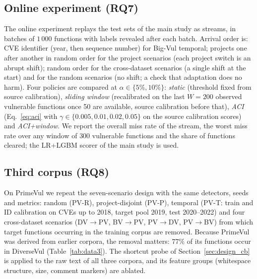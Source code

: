 \subsection{Online experiment (RQ7)}\label{sec:design_online}
The online experiment replays the test sets of the main study as streams, in batches of $1\,000$ functions with labels revealed after each batch. Arrival order is: CVE identifier (year, then sequence number) for Big-Vul temporal; projects one after another in random order for the project scenarios (each project switch is an abrupt shift); random order for the cross-dataset scenarios (a single shift at the start) and for the random scenarios (no shift; a check that adaptation does no harm). Four policies are compared at $\alpha\in\{5\%,10\%\}$: \emph{static} (threshold fixed from source calibration), \emph{sliding window} (recalibrated on the last $W{=}200$ observed vulnerable functions once 50 are available, source calibration before that), \emph{ACI} (Eq.~\eqref{eq:aci} with $\gamma\in\{0.005,0.01,0.02,0.05\}$ on the source calibration scores) and \emph{ACI+window}. We report the overall miss rate of the stream, the worst miss rate over any window of $300$ vulnerable functions and the share of functions cleared; the LR+LGBM scorer of the main study is used.

\subsection{Third corpus (RQ8)}\label{sec:design_pv}
On PrimeVul we repeat the seven-scenario design with the same detectors, seeds and metrics: random (PV-R), project-disjoint (PV-P), temporal (PV-T: train and ID calibration on CVEs up to 2018, target pool 2019, test 2020--2022) and four cross-dataset scenarios (DV$\to$PV, BV$\to$PV, PV$\to$DV, PV$\to$BV) from which target functions occurring in the training corpus are removed. Because PrimeVul was derived from earlier corpora, the removal matters: $77\%$ of its functions occur in DiverseVul (Table~\ref{tab:data3}). The shortcut probe of Section~\ref{sec:design_cb} is applied to the raw text of all three corpora, and its feature groups (whitespace structure, size, comment markers) are ablated.

